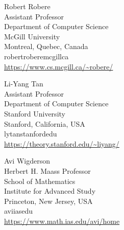 \documentclass{toc}
\begin{document}
\begin{tocauthors}
\begin{tocinfo}[pitassi]
\end{tocinfo}
\begin{tocinfo}[robere]
 Robert Robere\\                            %
 Assistant Professor\\
 Department of Computer Science\\
 McGill University\\
 Montreal, Quebec, Canada\\
 robert\tocdot{}robere\tocat{}mcgill\tocdot{}ca \\   %
 \url{https://www.cs.mcgill.ca/~robere/}      %
\end{tocinfo}
\begin{tocinfo}[tan]
 Li-Yang Tan\\
 Assistant Professor\\                     %
 Department of Computer Science\\
 Stanford University\\
 Stanford, California, USA\\
 lytan\tocat{}stanford\tocdot{}edu \\   %
 \url{https://theory.stanford.edu/~liyang/}      %
\end{tocinfo}
\begin{tocinfo}[wigderson]
 Avi Wigderson\\
 Herbert H. Maass Professor \\
 School of Mathematics\\
 Institute for Advanced Study\\
 Princeton, New Jersey, USA\\
 avi\tocat{}ias\tocdot{}edu \\   %
 \url{https://www.math.ias.edu/avi/home}      %
\end{tocinfo}
\end{tocauthors}

%
%
%
%
%
%
%
%
%
%
%
%
%
%
%
%
%
%
%
%
\end{document}
